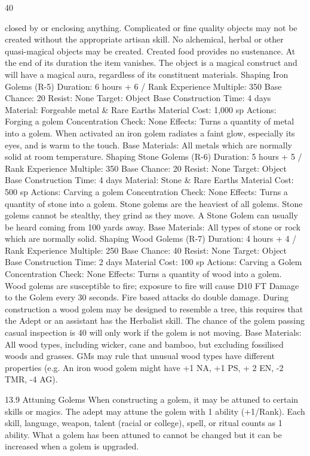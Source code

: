 \documentclass[a4paper]{article}
\begin{document}
\begin{multicols}{3}
40

closed by or enclosing anything. Complicated or
fine quality objects may not be created without the
appropriate artisan skill. No alchemical, herbal or
other quasi-magical objects may be created. Created food provides no sustenance. At the end of its
duration the item vanishes. The object is a magical
construct and will have a magical aura, regardless
of its constituent materials.
Shaping Iron Golems (R-5)
Duration: 6 hours + 6 / Rank
Experience Multiple: 350
Base Chance: 20%
Resist: None
Target: Object
Base Construction Time: 4 days
Material: Forgeable metal & Rare Earths
Material Cost: 1,000 sp
Actions: Forging a golem
Concentration Check: None
Effects: Turns a quantity of metal into a golem.
When activated an iron golem radiates a faint
glow, especially its eyes, and is warm to the touch.
Base Materials: All metals which are normally
solid at room temperature.
Shaping Stone Golems (R-6)
Duration: 5 hours + 5 / Rank
Experience Multiple: 350
Base Chance: 20%
Resist: None
Target: Object
Base Construction Time: 4 days
Material: Stone & Rare Earths Material Cost: 500
sp
Actions: Carving a golem
Concentration Check: None
Effects: Turns a quantity of stone into a golem.
Stone golems are the heaviest of all golems. Stone
golems cannot be stealthy, they grind as they
move. A Stone Golem can usually be heard coming
from 100 yards away.
Base Materials: All types of stone or rock which
are normally solid.
Shaping Wood Golems (R-7)
Duration: 4 hours + 4 / Rank
Experience Multiple: 250
Base Chance: 40%
Resist: None
Target: Object
Base Construction Time: 2 days
Material Cost: 100 sp
Actions: Carving a Golem
Concentration Check: None
Effects: Turns a quantity of wood into a golem.
Wood golems are susceptible to fire; exposure to
fire will cause D10 FT Damage to the Golem every
30 seconds. Fire based attacks do double damage.
During construction a wood golem may be designed to resemble a tree, this requires that the
Adept or an assistant has the Herbalist skill. The
chance of the golem passing casual inspection is
40%
will only work if the golem is not moving.
Base Materials: All wood types, including wicker,
cane and bamboo, but excluding fossilised woods
and grasses. GMs may rule that unusual wood
types have different properties (e.g. An iron wood
golem might have +1 NA, +1 PS, + 2 EN, -2 TMR,
-4 AG).

13.9 Attuning Golems
When constructing a golem, it may be attuned to
certain skills or magics. The adept may attune the
golem with 1 ability (+1/Rank). Each skill, language, weapon, talent (racial or college), spell, or
ritual counts as 1 ability. What a golem has been
attuned to cannot be changed but it can be increased when a golem is upgraded.


\end{multicols}
\end{document}
